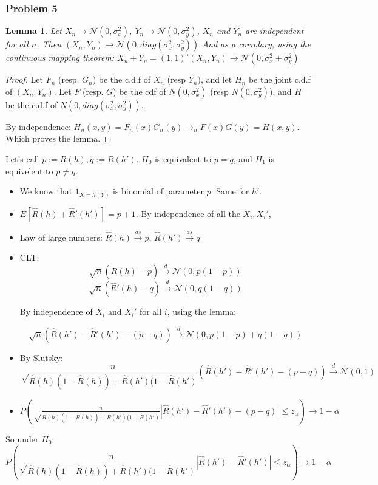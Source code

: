 \documentclass[12pt]{article}
\newcommand{\Q}[1]{\subsubsection*{Problem #1}}
\newtheorem{lemma}[theorem]{Lemma}
\begin{document}
\Q{5}


\begin{lemma}
Let $X_n \rightarrow \mathcal N(0, \sigma_x^2)$, $Y_n \rightarrow \mathcal N(0, \sigma_y^2)$, $X_n$ and $Y_n$ are independent for all $n$.
Then $(X_n, Y_n) \rightarrow \mathcal N(0, diag(\sigma_x^2,\sigma_y^2) )$
And as a corrolary, using the continuous mapping theorem:
$X_n + Y_n  = (1, 1)' (X_n, Y_n) \rightarrow \mathcal N(0, \sigma_x^2 + \sigma_y^2 )$
\end{lemma}
\begin{proof}
Let $F_n$ (resp. $G_n$) be the c.d.f of $X_n$ (resp $Y_n$), and let $H_n$ be the joint c.d.f of $(X_n, Y_n)$.
Let $F$ (resp. $G$) be the cdf of $N(0, \sigma_x^2)$ (resp $N(0, \sigma_y^2)$), and $H$ be the c.d.f of $N(0, diag(\sigma_x^2,\sigma_y^2) )$.

By independence:
$H_n(x, y) = F_n(x) G_n(y) \rightarrow_n F(x)G(y) = H(x, y)$.
Which proves the lemma.
\end{proof}


\hfill \break
Let's call $p := R(h), q := R(h')$. $H_0$ is equivalent to $p = q$, and $H_1$ is equivelent to $p \ne q$.
\begin{itemize}
\item We know that $1_{X = h(Y)}$ is binomial of parameter $p$. Same for $h'$.
\item $E [\hat R(h) + \hat R'(h')] = p+1$. By independence of all the $X_i, X_i'$, 
\item Law of large numbers: $\hat R(h) \overset{as}{ \rightarrow } p$, $\hat R(h') \overset{as}{ \rightarrow } q$
\item CLT:
  $$\sqrt{n} (\hat R(h) - p) \overset{d}{ \rightarrow } \mathcal N(0, p(1-p)) $$
  $$\sqrt{n} (\hat R'(h) - q) \overset{d}{ \rightarrow } \mathcal N(0, q(1-q)) $$

  By independence of $X_i$ and $X_i'$ for all $i$, using the lemma:
  
$$\sqrt{n} (\hat R(h') - \hat R'(h') - (p-q) ) \overset{d}{ \rightarrow } \mathcal N(0, p(1-p) + q(1-q)) $$
\item By Slutsky:
  $$\sqrt \frac n {\hat R(h)(1-\hat R(h))+\hat R(h')(1-\hat R(h')} (\hat R(h') -  \hat R'(h') - (p-q)) \overset{d}{ \rightarrow } \mathcal N(0, 1)$$
\item $P(\sqrt \frac n {\hat R(h)(1-\hat R(h))+\hat R(h')(1-\hat R(h')} |\hat R(h') -\hat R'(h') - (p-q)| \le z_\alpha) \rightarrow 1 - \alpha$
\end{itemize}
So under $H_0$:
$$P(\sqrt \frac n {\hat R(h)(1-\hat R(h))+\hat R(h')(1-\hat R(h')} |\hat R(h') -\hat R'(h')| \le z_\alpha) \rightarrow 1 - \alpha$$
\end{document}
